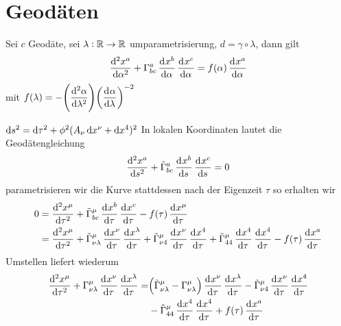  \section{Geodäten}
 \begin{bemerkung}
 Sei $c$ Geodäte, sei $\lambda:\mathbb{R}\to \mathbb{R}$ umparametrisierung,
 $d=\gamma\circ\lambda$, dann gilt 
 \begin{equation}
\dod[2]{x^a}{\alpha}+\Gamma^{a}_{bc}\dod{x^b}{\alpha}\dod{x^c}{\alpha}=f(\alpha)\dod{x^a}{\alpha}
 \end{equation}
 mit
 $f(\lambda)=-\left(\dod[2]{\alpha}{\lambda}\right)\left(\dod{\alpha}{\lambda}\right)^{-2}$
 \end{bemerkung}
 
 
 
$\dif s^2=\dif \tau^2+\phi^2(A_\nu\dif x^\nu+\dif x^4)^2$
In lokalen Koordinaten lautet die Geodätengleichung
\begin{equation}
\dod[2]{x^a}{s}+\tilde{\Gamma}^{a}_{bc}\dod{x^b}{s}\dod{x^c}{s}=0
\end{equation}
parametrisieren wir die Kurve stattdessen nach der Eigenzeit $\tau$ so erhalten
wir 
\begin{equation}
\begin{split}
0&=\dod[2]{x^\mu}{\tau}+\tilde{\Gamma}^{\mu}_{bc}\dod{x^b}{\tau}\dod{x^c}{\tau}
-f(\tau)\dod{x^\mu}{\tau}\\
&=\dod[2]{x^\mu}{\tau}
+\tilde{\Gamma}^{\mu}_{\nu\lambda}\dod{x^\nu}{\tau}\dod{x^\lambda}{\tau}
+\tilde{\Gamma}^{\mu}_{\nu 4}\dod{x^\nu}{\tau}\dod{x^4}{\tau}
+\tilde{\Gamma}^{\mu}_{44}\dod{x^4}{\tau}\dod{x^4}{\tau}
-f(\tau)\dod{x^a}{\tau}\\
\end{split}
\end{equation}
Umstellen liefert wiederum
\begin{equation}
\begin{split}
\dod[2]{x^\mu}{\tau}
+\Gamma^{\mu}_{\nu\lambda}\dod{x^\nu}{\tau}\dod{x^\lambda}{\tau}
=&\left(\tilde{\Gamma}^{\mu}_{\nu\lambda}-\Gamma^{\mu}_{\nu\lambda}\right)\dod{x^\nu}{\tau}\dod{x^\lambda}{\tau}
-\tilde{\Gamma}^{\mu}_{\nu
4}\dod{x^\nu}{\tau}\dod{x^4}{\tau} \\
&-\tilde{\Gamma}^{\mu}_{44}\dod{x^4}{\tau}\dod{x^4}{\tau}
+f(\tau)\dod{x^a}{\tau}
\end{split}
\end{equation}
